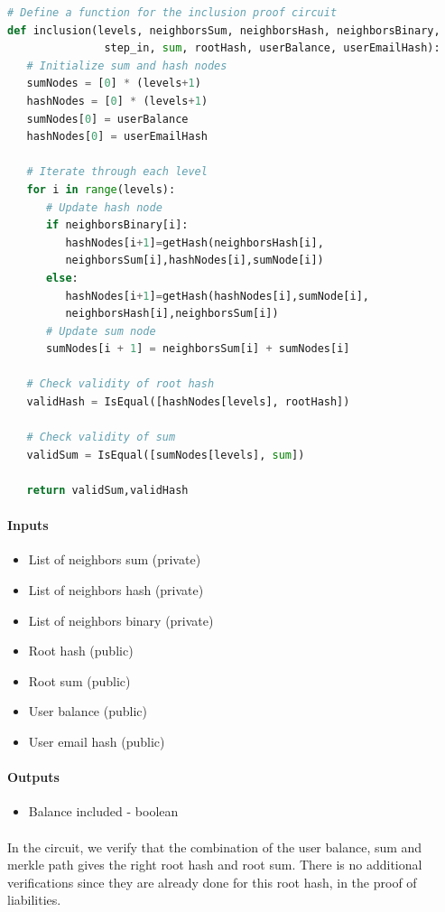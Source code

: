 \begin{lstlisting}[language=Python, caption=Inclusion circuit pseudocode]
# Define a function for the inclusion proof circuit
def inclusion(levels, neighborsSum, neighborsHash, neighborsBinary, 
               step_in, sum, rootHash, userBalance, userEmailHash):
   # Initialize sum and hash nodes
   sumNodes = [0] * (levels+1)
   hashNodes = [0] * (levels+1)
   sumNodes[0] = userBalance
   hashNodes[0] = userEmailHash

   # Iterate through each level
   for i in range(levels):
      # Update hash node
      if neighborsBinary[i]:
         hashNodes[i+1]=getHash(neighborsHash[i],
         neighborsSum[i],hashNodes[i],sumNode[i])
      else:
         hashNodes[i+1]=getHash(hashNodes[i],sumNode[i],
         neighborsHash[i],neighborsSum[i])
      # Update sum node
      sumNodes[i + 1] = neighborsSum[i] + sumNodes[i]

   # Check validity of root hash
   validHash = IsEqual([hashNodes[levels], rootHash])

   # Check validity of sum
   validSum = IsEqual([sumNodes[levels], sum])

   return validSum,validHash
\end{lstlisting}


\paragraph{Inputs}
\begin{itemize}
   \item List of neighbors sum (private)
   \item List of neighbors hash (private)
   \item List of neighbors binary (private)
   \item Root hash (public)
   \item Root sum (public)
   \item User balance (public)
   \item User email hash (public)
   \end{itemize}


\paragraph{Outputs}
\begin{itemize}
   \item Balance included - boolean
   \end{itemize}

\paragraph{}
In the circuit, we verify that the combination of the user balance, sum and merkle path gives the right root hash and root sum. There is no additional
verifications since they are already done for this root hash, in the proof of liabilities.

